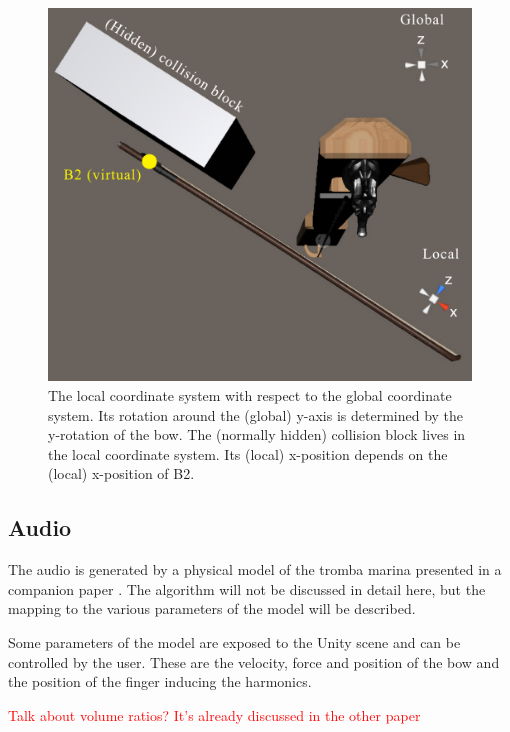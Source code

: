 \documentclass[dvipsnames, pdftex]{article}
\def\SWcomment[#1]{\textcolor{Red}{#1}}
\begin{document}
\begin{figure}[ht]\includegraphics[width=1.0\columnwidth]{SMC 2020 paper template LaTeX/globalLocal.pdf}
\centering
  \caption{The local coordinate system with respect to the global coordinate system. Its rotation around the (global) y-axis is determined by the y-rotation of the bow. The (normally hidden) collision block lives in the local coordinate system. Its (local) x-position depends on the (local) x-position of B2. \label{fig:localGlobal}}
\end{figure}

\subsection{Audio}
The audio is generated by a physical model of the tromba marina presented in a companion paper \cite{Willemsen2020}. The algorithm will not be discussed in detail here, but the mapping to the various parameters of the model will be described. 

Some parameters of the model are exposed to the Unity scene and can be controlled by the user. These are the velocity, force and position of the bow and the position of the finger inducing the harmonics.

\SWcomment[Talk about volume ratios? It's already discussed in the other paper]
\end{document}
